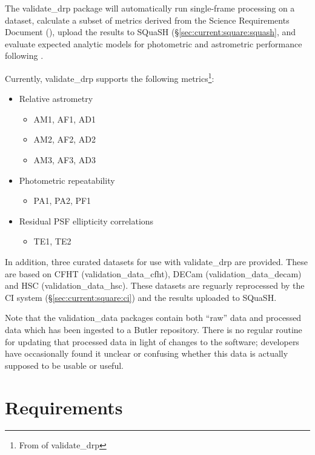 \documentclass[DM,authoryear,toc,lsstdraft]{lsstdoc}
\begin{document}
The validate\_drp package will automatically run single-frame processing on a
dataset, calculate a subset of metrics derived from the Science Requirements
Document (), upload the results to SQuaSH
(\S\ref{sec:current:square:squash}, and evaluate expected analytic models for
photometric and astrometric performance following \cite{2008arXiv0805.2366I}.

Currently, validate\_drp supports the following metrics\footnote{From
 of validate\_drp }:

\begin{itemize}
\item{Relative astrometry
  \begin{itemize}
    \item{AM1, AF1, AD1}
    \item{AM2, AF2, AD2}
    \item{AM3, AF3, AD3}
  \end{itemize}
}
\item{Photometric repeatability
  \begin{itemize}
    \item{PA1, PA2, PF1}
  \end{itemize}
}
\item{Residual PSF ellipticity correlations
  \begin{itemize}
    \item{TE1, TE2}
  \end{itemize}
}
\end{itemize}

In addition, three curated datasets for use with validate\_drp are provided.
These are based on CFHT (validation\_data\_cfht), DECam
(validation\_data\_decam) and HSC (validation\_data\_hsc). These datasets are
reguarly reprocessed by the CI system (\S\ref{sec:current:square:ci}) and the
results uploaded to SQuaSH.

Note that the validation\_data packages contain both ``raw'' data and
processed data which has been ingested to a Butler repository. There is no
regular routine for updating that processed data in light of changes to the
software; developers have occasionally found it unclear or confusing whether
this data is actually supposed to be usable or useful.

\section{Requirements}
\label{sec:req}



\end{document}
